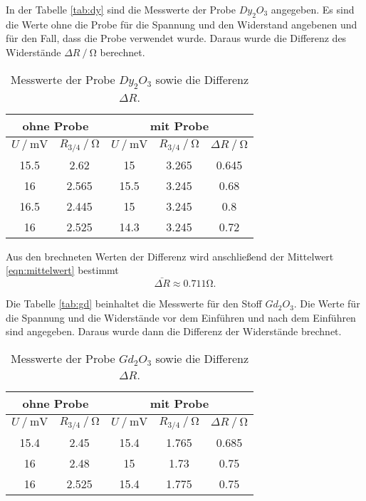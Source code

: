 In der Tabelle \eqref{tab:dy} sind die Messwerte der Probe $Dy_2O_3$ angegeben. Es sind die 
Werte ohne die Probe für die Spannung und den Widerstand angebenen und für den Fall, dass die Probe
verwendet wurde. Daraus wurde die Differenz des Widerstände $\Delta R\mathbin{/}\si{\ohm}$ berechnet.

\begin{table}
  \centering
  \caption{Messwerte der Probe $Dy_2O_3$ sowie die Differenz $\Delta R$.}
  \label{tab:dy}
\begin{tabular}{c c | c c | c}
  \hline
  \multicolumn{2}{c}{ohne Probe} & \multicolumn{3}{c}{mit Probe} \\
  \hline
  $U\mathbin{/} \si{\mV}$ & $R_{3/4}\mathbin{/} \si{\ohm}$ & $U\mathbin{/} \si{\mV}$ & $R_{3/4}\mathbin{/} \si{\ohm}$ & $\Delta R\mathbin{/}\si{\ohm}$ \\
  \hline
  15.5  & 2.62 & 15    & 3.265 & 0.645\\
  16  & 2.565 & 15.5   & 3.245 & 0.68\\
  16.5 & 2.445 & 15   & 3.245 & 0.8\\
  16  & 2.525 & 14.3   & 3.245 & 0.72\\
  \bottomrule
  \end{tabular}
\end{table}

Aus den brechneten Werten der Differenz wird anschließend der Mittelwert \eqref{eqn:mittelwert} bestimmt
\begin{equation*}
  \bar{\Delta R} \approx 0.711 \si{\ohm}.
\end{equation*}

Die Tabelle \eqref{tab:gd} beinhaltet die Messwerte für den Stoff $Gd_2O_3$. Die Werte für die Spannung und die Widerstände
vor dem Einführen und nach dem Einführen sind angegeben. Daraus wurde dann die Differenz der Widerstände brechnet. 
\begin{table}
  \centering
  \caption{Messwerte der Probe $Gd_2O_3$ sowie die Differenz $\Delta R$.}
  \label{tab:gd}
\begin{tabular}{c c | c c | c}
  \hline
  \multicolumn{2}{c}{ohne Probe} & \multicolumn{3}{c}{mit Probe} \\
  \hline
  $U\mathbin{/} \si{\mV}$ & $R_{3/4}\mathbin{/} \si{\ohm}$ & $U\mathbin{/} \si{\mV}$ & $R_{3/4}\mathbin{/} \si{\ohm}$ & $\Delta R\mathbin{/}\si{\ohm}$ \\
  \hline
  15.4 & 2.45 & 15.4  & 1.765 & 0.685\\
  16  & 2.48 & 15  & 1.73 & 0.75\\
  16 & 2.525& 15.4  & 1.775 & 0.75\\
  \bottomrule
  \end{tabular}
\end{table}

